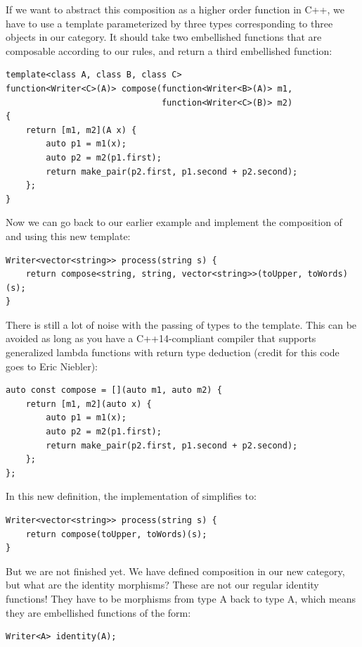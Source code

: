If we want to abstract this composition as a higher order function in
C++, we have to use a template parameterized by three types
corresponding to three objects in our category. It should take two
embellished functions that are composable according to our rules, and
return a third embellished function:

\begin{verbatim}
template<class A, class B, class C>
function<Writer<C>(A)> compose(function<Writer<B>(A)> m1,
                               function<Writer<C>(B)> m2)
{
    return [m1, m2](A x) {
        auto p1 = m1(x);
        auto p2 = m2(p1.first);
        return make_pair(p2.first, p1.second + p2.second); 
    };
}
\end{verbatim}

Now we can go back to our earlier example and implement the composition
of  and  using this new template:

\begin{verbatim}
Writer<vector<string>> process(string s) { 
    return compose<string, string, vector<string>>(toUpper, toWords)(s);
}
\end{verbatim}

There is still a lot of noise with the passing of types to the
 template. This can be avoided as long as you have a
C++14-compliant compiler that supports generalized lambda functions with
return type deduction (credit for this code goes to Eric Niebler):

\begin{verbatim}
auto const compose = [](auto m1, auto m2) { 
    return [m1, m2](auto x) { 
        auto p1 = m1(x);
        auto p2 = m2(p1.first);
        return make_pair(p2.first, p1.second + p2.second);
    };
};
\end{verbatim}

In this new definition, the implementation of 
simplifies to:

\begin{verbatim}
Writer<vector<string>> process(string s) {
    return compose(toUpper, toWords)(s);
}
\end{verbatim}

But we are not finished yet. We have defined composition in our new
category, but what are the identity morphisms? These are not our regular
identity functions! They have to be morphisms from type A back to type
A, which means they are embellished functions of the form:

\begin{verbatim}
Writer<A> identity(A);
\end{verbatim}

